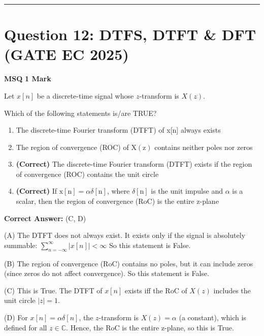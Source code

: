 \documentclass[11pt,a4paper]{article}
\begin{document}
\vspace{1.5em}
\hrule
\vspace{1.5em}

\section*{Question 12: DTFS, DTFT \& DFT (GATE EC 2025)}
\noindent \textbf{\color{primary}MSQ} \hfill \textbf{\color{secondary}1 Mark}


\noindent Let $x[n]$ be a discrete-time signal whose $z$-transform is $X(z)$.

Which of the following statements is/are TRUE?


\begin{enumerate}[label=(\Alph*)]
    \item The discrete-time Fourier transform (DTFT) of x[n] always exists
    \item The region of convergence (ROC) of $\mathrm{X}(\mathrm{z})$ contains neither poles nor zeros
    \item \textbf{(Correct)} The discrete-time Fourier transform (DTFT) exists if the region of convergence (ROC) contains the unit circle
    \item \textbf{(Correct)} If $\mathrm{x}[\mathrm{n}]=\alpha \delta[\mathrm{n}]$, where $\delta[\mathrm{n}]$ is the unit impulse and $\alpha$ is a scalar, then the region of convergence (RoC) is the entire z-plane
\end{enumerate}

\noindent \textbf{Correct Answer:} (C, D)

\begin{tcolorbox}[solbox, title=Detailed Solution -- Question 12]
(A) The DTFT does not always exist. It exists only if the signal is absolutely summable:
$\sum_{n=-\infty}^{\infty} |x[n]| < \infty$
So this statement is False. 

(B) The region of convergence (RoC) contains no poles, but it can include zeros (since zeros do not affect convergence).
So this statement is False. 

(C) This is True. The DTFT of $x[n]$ exists iff the RoC of $X(z)$ includes the unit circle $|z| = 1$. 

(D) For $x[n] = \alpha \delta[n]$, the $z$-transform is $X(z) = \alpha$ (a constant), which is defined for all $z \in \mathbb{C}$. Hence, the RoC is the entire z-plane, so this is True.
\end{tcolorbox}
\end{document}
